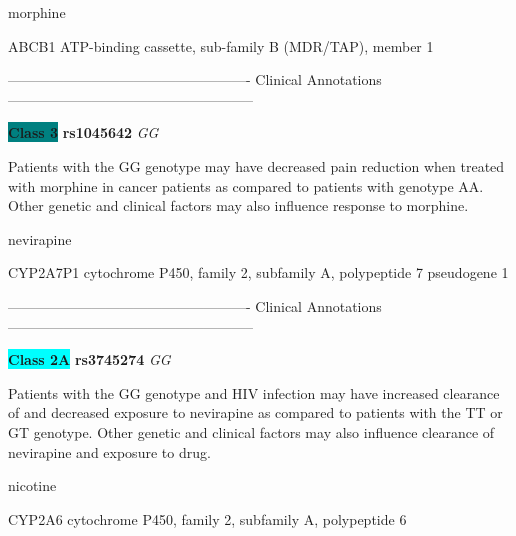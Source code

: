 \documentclass{resume} %
\begin{document}
\begin{rSection}{ morphine }
\begin{rSubsection}{ ABCB1 }{ ATP-binding cassette, sub-family B (MDR/TAP), member 1 }{}{}
\item[]

\item[] ---------------------------------------------------- Clinical Annotations -----------------------------------------------------\newline
\item \textbf{\colorbox{teal} {Class 3}} \textbf{ rs1045642 } \textit{ GG }
\item[] Patients with the GG genotype may have decreased pain reduction when treated with morphine in cancer patients as compared to patients with genotype AA. Other genetic and clinical factors may also influence response to morphine.
\end{rSubsection}

\end{rSection}\begin{rSection}{ nevirapine }
\item[]

\begin{rSubsection}{ CYP2A7P1 }{ cytochrome P450, family 2, subfamily A, polypeptide 7 pseudogene 1 }{}{}
\item[]

\item[] ---------------------------------------------------- Clinical Annotations -----------------------------------------------------\newline
\item \textbf{\colorbox{cyan} {Class 2A}} \textbf{ rs3745274 } \textit{ GG }
\item[] Patients with the GG genotype and HIV infection may have increased clearance of and decreased exposure to nevirapine as compared to patients with the TT or GT genotype. Other genetic and clinical factors may also influence clearance of nevirapine and exposure to drug.
\end{rSubsection}

\end{rSection}\begin{rSection}{ nicotine }
\item[]

\begin{rSubsection}{ CYP2A6 }{ cytochrome P450, family 2, subfamily A, polypeptide 6 }{}{}
\item[]


\end{rSubsection}
\end{rSection}
\end{document}
